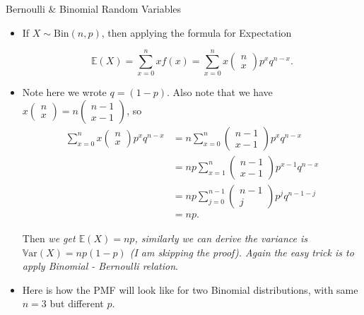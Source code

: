 \documentclass[8pt, usepdftitle=false]{beamer}
\begin{document}
\begin{frame}[allowframebreaks]{Bernoulli \& Binomial Random Variables}
\begin{itemize}
\framebreak


\item If $X \sim \mathrm{Bin}(n, p)$, then applying the formula for Expectation

$$
\mathbb{E}(X)=\sum_{x=0}^n x f(x)=\sum_{x=0}^n x\left(\begin{array}{l}
n \\
x
\end{array}\right) p^x q^{n-x} .
$$

\item Note here we wrote $q = (1-p)$. Also note that we have $x\left(\begin{array}{c}n \\ x\end{array}\right)=n\left(\begin{array}{c}n-1 \\ x-1\end{array}\right)$, so
$$
\begin{aligned}
\sum_{x=0}^n x\left(\begin{array}{l}
n \\
x
\end{array}\right) p^x q^{n-x} &=n \sum_{x=0}^n\left(\begin{array}{c}
n-1 \\
x-1
\end{array}\right) p^x q^{n-x} \\
&=n p \sum_{x=1}^n\left(\begin{array}{c}
n-1 \\
x-1
\end{array}\right) p^{x-1} q^{n-x} \\
&=n p \sum_{j=0}^{n-1}\left(\begin{array}{c}
n-1 \\
j
\end{array}\right) p^j q^{n-1-j} \\
&=n p .
\end{aligned}
$$

Then \emph{we get $\mathbb{E}(X) = np$, similarly we can derive the variance is $\mathbb{V}\mathrm{ar}(X) = np(1-p)$ (I am skipping the proof). Again the easy trick is to apply Binomial - Bernoulli relation}.


\item Here is how the PMF will look like for two Binomial distributions, with same $n = 3$ but different $p$.


\end{itemize}
\end{frame}
\end{document}
